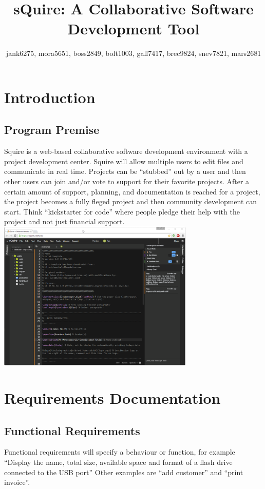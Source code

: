 \documentclass[11pt]{report}
\title{sQuire: A Collaborative Software Development Tool}
\author{jank6275, mora5651, boss2849, bolt1003, gall7417, brec9824, snev7821, mars2681}
\begin{document}
\maketitle

\tableofcontents

\chapter{Introduction}

\section{Program Premise}
    Squire is a web-based collaborative software development environment with a project development center. Squire will allow multiple users to edit files and communicate in real time. Projects can be ``stubbed'' out by a user and then other users can join and/or vote to support for their favorite projects. After a certain amount of support, planning, and documentation is reached for a project, the project becomes a fully fleged project and then community development can start. Think ``kickstarter for code'' where people pledge their help with the project and not just financial support.
    \includegraphics[width=0.7\textwidth]{squire}

\chapter{Requirements Documentation}

\section{Functional Requirements}
    Functional requirements will specify a behaviour or function, for example ``Display the name, total size, available space and format of a flash drive connected to the USB port'' Other examples are ``add customer'' and ``print invoice''.
    
\end{document}

